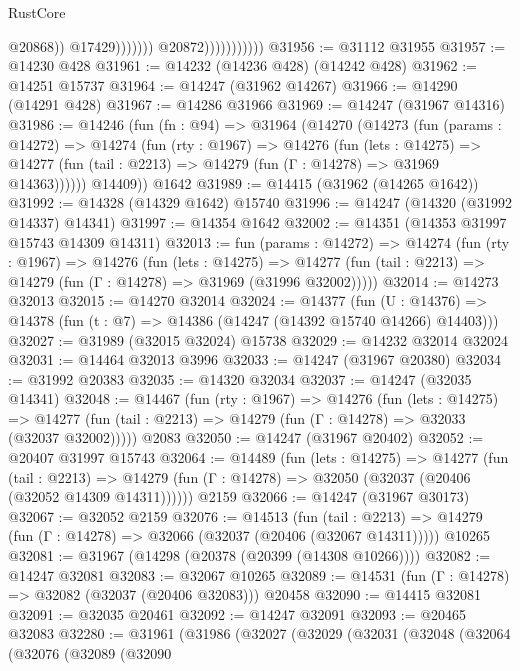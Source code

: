 \begin{lexlean}{RustCore}
\begin{coremodule}
                                            @20868))
                                        @17429)))))))
                          @20872)))))))))))
@31956 := @31112 @31955
@31957 := @14230 @428
@31961 := @14232 (@14236 @428) (@14242 @428)
@31962 := @14251 @15737
@31964 := @14247 (@31962 @14267)
@31966 := @14290 (@14291 @428)
@31967 := @14286 @31966
@31969 := @14247 (@31967 @14316)
@31986 := @14246
    (fun (fn : @94) =>
    @31964
      (@14270
        (@14273
          (fun (params : @14272) =>
          @14274
            (fun (rty : @1967) =>
            @14276
              (fun (lets : @14275) =>
              @14277 (fun (tail : @2213) => @14279 (fun (Γ : @14278) => @31969 @14363))))))
        @14409))
    @1642
@31989 := @14415 (@31962 (@14265 @1642))
@31992 := @14328 (@14329 @1642) @15740
@31996 := @14247 (@14320 (@31992 @14337) @14341)
@31997 := @14354 @1642
@32002 := @14351 (@14353 @31997 @15743 @14309 @14311)
@32013 := fun (params : @14272) =>
  @14274
    (fun (rty : @1967) =>
    @14276
      (fun (lets : @14275) =>
      @14277 (fun (tail : @2213) => @14279 (fun (Γ : @14278) => @31969 (@31996 @32002)))))
@32014 := @14273 @32013
@32015 := @14270 @32014
@32024 := @14377
    (fun (U : @14376) => @14378 (fun (t : @7) => @14386 (@14247 (@14392 @15740 @14266) @14403)))
@32027 := @31989 (@32015 @32024) @15738
@32029 := @14232 @32014 @32024
@32031 := @14464 @32013 @3996
@32033 := @14247 (@31967 @20380)
@32034 := @31992 @20383
@32035 := @14320 @32034
@32037 := @14247 (@32035 @14341)
@32048 := @14467
    (fun (rty : @1967) =>
    @14276
      (fun (lets : @14275) =>
      @14277 (fun (tail : @2213) => @14279 (fun (Γ : @14278) => @32033 (@32037 @32002)))))
    @2083
@32050 := @14247 (@31967 @20402)
@32052 := @20407 @31997 @15743
@32064 := @14489
    (fun (lets : @14275) =>
    @14277
      (fun (tail : @2213) =>
      @14279 (fun (Γ : @14278) => @32050 (@32037 (@20406 (@32052 @14309 @14311))))))
    @2159
@32066 := @14247 (@31967 @30173)
@32067 := @32052 @2159
@32076 := @14513
    (fun (tail : @2213) => @14279 (fun (Γ : @14278) => @32066 (@32037 (@20406 (@32067 @14311)))))
    @10265
@32081 := @31967 (@14298 (@20378 (@20399 (@14308 @10266))))
@32082 := @14247 @32081
@32083 := @32067 @10265
@32089 := @14531 (fun (Γ : @14278) => @32082 (@32037 (@20406 @32083))) @20458
@32090 := @14415 @32081
@32091 := @32035 @20461
@32092 := @14247 @32091
@32093 := @20465 @32083
@32280 := @31961
    (@31986
      (@32027
        (@32029
          (@32031
            (@32048
              (@32064
                (@32076
                  (@32089
                    (@32090

\end{coremodule}
\end{lexlean}
